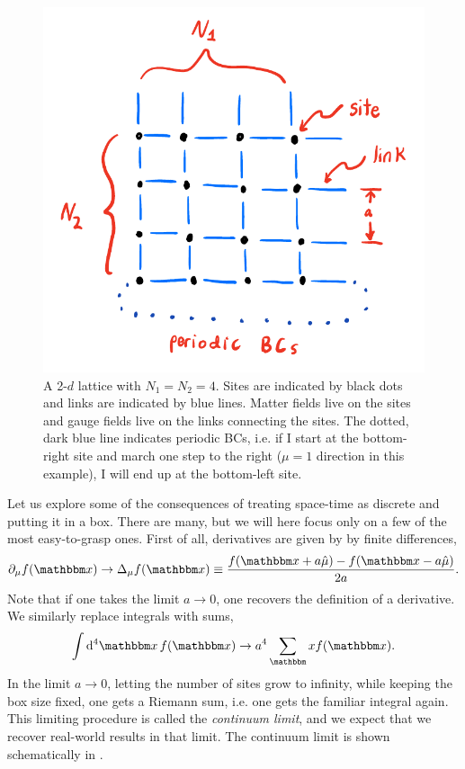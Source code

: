 \begin{figure}
  \centering
  \includegraphics[width=\linewidth]{figs/lattice2d.pdf}
  \caption{A 2-$d$ lattice with $N_1=N_2=4$. Sites are indicated by black dots
and links are indicated by blue lines. Matter fields live on the sites and gauge
fields live on the links connecting the sites. The dotted, dark blue line 
indicates periodic BCs,
i.e. if I start at the bottom-right site and march one step to the right
($\mu=1$ direction in this example), I will end up at the bottom-left site.}
  \label{fig:lattice} 
\end{figure}

Let us explore some of the consequences of treating space-time as discrete
and putting it in a box.
There are many, but we will here focus only on a few of the most easy-to-grasp
ones. First of all, derivatives are given by
by finite differences,
\begin{equation}\label{eq:dertodiff}
  \partial_\mu f(\fvec{x})\to\Delta_{\mu}f(\fvec{x})\equiv\frac{f(\fvec{x}+a\hat{\mu})
                                                   -f(\fvec{x}-a\hat{\mu})}{2a}.
\end{equation}
Note that if one takes the limit $a\to0$, one recovers the definition of a derivative.
We similarly replace integrals with sums,
\begin{equation}\label{eq:inttosum}
  \int \dd[4]{\fvec{x}}f(\fvec{x})\to a^4\sum_\fvec{x}f(\fvec{x}).
\end{equation}
In the limit $a\to0$, letting the number of sites grow to infinity, while
keeping the box size fixed, one gets a Riemann sum, i.e. one gets the familiar
integral again. 
This limiting procedure is called the {\it continuum limit}, and we expect that we recover real-world results in that limit. 
The continuum limit is shown schematically in .

